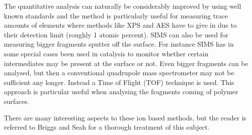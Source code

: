 The quantitative analysis can naturally be considerably improved by using well known standards and the method is particularly useful for measuring trace amounts of elements where methods like XPS and AES have to give in due to their detection limit (roughly 1 atomic percent). SIMS can also be used for measuring bigger fragments sputter off the surface. For instance SIMS has in some special cases been used in catalysis to monitor whether certain intermediates may be present at the surface or not. Even bigger fragments can be analysed, but then a conventional quadrupole mass spectrometer may not be sufficient any longer. Instead a Time of Flight  (TOF) technique is used. This approach is particular useful when analysing the fragments coming of polymer surfaces.

There are many interesting aspects to these ion based methods, but the reader is referred to Briggs and Seah for a thorough treatment \cite{briggs2} of this subject.